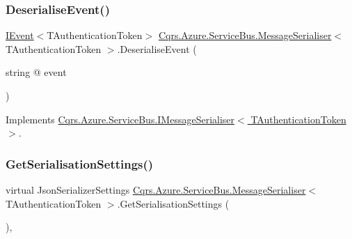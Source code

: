 \subsubsection{\texorpdfstring{Deserialise\+Event()}{DeserialiseEvent()}}
{\footnotesize\ttfamily \hyperlink{interfaceCqrs_1_1Events_1_1IEvent}{I\+Event}$<$T\+Authentication\+Token$>$ \hyperlink{classCqrs_1_1Azure_1_1ServiceBus_1_1MessageSerialiser}{Cqrs.\+Azure.\+Service\+Bus.\+Message\+Serialiser}$<$ T\+Authentication\+Token $>$.Deserialise\+Event (\begin{DoxyParamCaption}\item[{string @}]{event }\end{DoxyParamCaption})}



Implements \hyperlink{interfaceCqrs_1_1Azure_1_1ServiceBus_1_1IMessageSerialiser_ab65c6e4a8c2a660ceb2236ee11fd33f6}{Cqrs.\+Azure.\+Service\+Bus.\+I\+Message\+Serialiser$<$ T\+Authentication\+Token $>$}.

\mbox{\label{classCqrs_1_1Azure_1_1ServiceBus_1_1MessageSerialiser_aca8f19355749092a6ad7b5085dc7f057}} 
\subsubsection{\texorpdfstring{Get\+Serialisation\+Settings()}{GetSerialisationSettings()}}
{\footnotesize\ttfamily virtual Json\+Serializer\+Settings \hyperlink{classCqrs_1_1Azure_1_1ServiceBus_1_1MessageSerialiser}{Cqrs.\+Azure.\+Service\+Bus.\+Message\+Serialiser}$<$ T\+Authentication\+Token $>$.Get\+Serialisation\+Settings (\begin{DoxyParamCaption}{ }\end{DoxyParamCaption})\hspace{0.3cm}{\ttfamily [protected]}, {\ttfamily [virtual]}}

\mbox{\label{classCqrs_1_1Azure_1_1ServiceBus_1_1MessageSerialiser_a50107f67d604c45136d9fa3d73400e3a}} 
